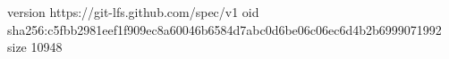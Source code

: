 version https://git-lfs.github.com/spec/v1
oid sha256:c5fbb2981eef1f909ec8a60046b6584d7abc0d6be06c06ec6d4b2b6999071992
size 10948
